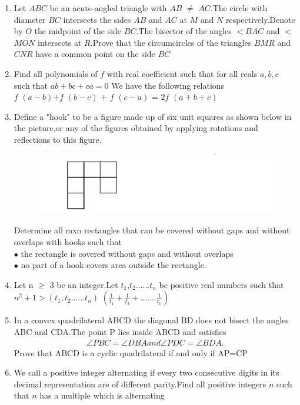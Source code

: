 \documentclass[12pt,-letter paper]{article}
\providecommand{\brak}[1]{\ensuremath{\left(#1\right)}}
\begin{document}
\begin{enumerate}
	\item Let $ABC$ be an acute-angled triangle  with $AB$ $\neq$ $AC$.The circle with diameter $BC$ intersects the sides $AB$ and $AC$ at $M$ and $N$ respectively.Denote  by $O$ the midpoint of the side $BC$.The bisector of the angles $<$$BAC$ and $<$$MON$ intersects at $R$.Prove that the circumcircles of the triangles $BMR$ and $CNR$ have a common point on the side $BC$ 
	\item Find all polynomials of $f$ with real coefficient such that for all reals $a,b,c$ such that $ab+bc+ca=0$ We have the following relations \\ $f$ $(a-b)$+$f$ $(b-c)$ + $f$ $(c-a)$ = $2f$ $(a+b+c)$
	\item Define a "hook" to be a figure made up of six unit squares as shown below in the picture,or any of the figures obtained by applying rotations and reflections to this figure. 
\begin{figure}[!ht]
  \includegraphics[width=\columnwidth]   {./img2.jpg}
                \end{figure}
Determine all mxn rectangles that can be covered without gaps and without overlaps with hooks such that\\
$\bullet$ the rectangle is covered without gaps and without overlaps\\
$\bullet$ no part of a hook covers area outside the rectangle.
	\item Let n $\geq$ 3 be an integer.Let $t_1$,$t_2$......$t_n$ be positive real numbers such that \\ $n^{2}+1>\brak{t_1,t_2......t_n}$  $\brak{\frac{1}{t_1}+\frac{1}{t_2}+.......\frac{1}{t_n}}$ 
	\item In a convex quadrilateral ABCD the diagonal BD does not bisect the angles ABC and CDA.The point P lies inside ABCD and satisfies 
\begin{align*}
\angle{PBC}=\angle{DBA} and \angle{PDC}=\angle{BDA}.
\end{align*}
Prove that ABCD is a cyclic quadrilateral if and only if AP=CP
	\item We call a positive integer alternating if every two consecutive digits in its decimal representation are of different parity.Find all positive integers $n$ such that $n$ has a multiple which is alternating 
	 

\end{enumerate}
\end{document}
